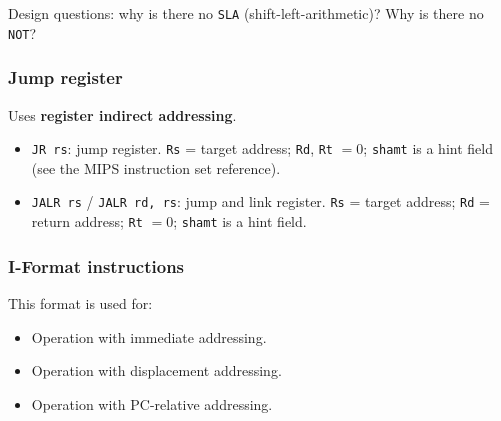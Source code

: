 \begin{remark}
Design questions: why is there no \texttt{SLA} (shift-left-arithmetic)?
Why is there no \texttt{NOT}?
\end{remark}

\subsubsection{Jump register}

Uses \textbf{register indirect addressing}.
\begin{itemize}
  \item \texttt{JR rs}: jump register. \texttt{Rs} = target address;
  \texttt{Rd}, \texttt{Rt} $= 0$; \texttt{shamt} is a hint field (see the MIPS instruction set reference).
  \item \texttt{JALR rs} / \texttt{JALR rd, rs}: jump and link register.
  \texttt{Rs} = target address; \texttt{Rd} = return address; \texttt{Rt}
  $=0$; \texttt{shamt} is a hint field.
\end{itemize}

\subsubsection{I-Format instructions}

\begin{center}\begin{minipage}{\linewidth}\centering
{}
\end{minipage}
\end{center}

This format is used for:
\begin{itemize}
  \item Operation with immediate addressing.
  \item Operation with displacement addressing.
  \item Operation with PC-relative addressing.
\end{itemize}

